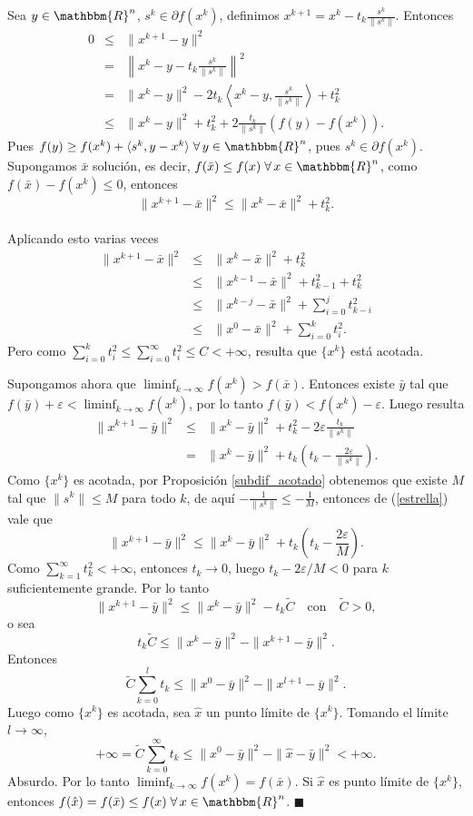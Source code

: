 \documentclass[a4paper,12pt]{report}
\newcommand{\la}{\langle}
\newcommand{\ra}{\rangle}
\newcommand{\RR}{\mathbbm{R}}
\newcommand{\Rn}{\RR^n}
\newcommand{\bx}{\bar{x}}
\newcommand{\vep}{\varepsilon}
\newcommand{\arr}{\rightarrow}
\newenvironment{dem}{\vspace*{-0.1cm}{\it Demostraci\'on:}}{\hfill
$\blacksquare$\\}
\begin{document}
\begin{dem}
Sea $y\in\Rn$, $s^k\in\partial f(x^k)$, definimos $x^{k+1}=x^k-t_k\frac{s^k}{\|s^k\|}$.
Entonces
\begin{eqnarray*}
0&\leq&\|x^{k+1}-y\|^2\\
&=&\left\|x^k-y-t_k\frac{s^k}{\|s^k\|}\right\|^2\\
&=&\|x^k-y\|^2-2t_k\left\la x^k-y,\frac{s^k}{\|s^k\|}\right\ra+t_k^2\\
&\leq&\|x^k-y\|^2+t_k^2+2\frac{t_k}{\|s^k\|}(f(y)-f(x^k)).
\end{eqnarray*}
Pues $f(y)\geq f(x^k)+\la s^k,y-x^k\ra\;\forall\,y\in\Rn$, pues $s^k\in\partial f(x^k)$.
Supongamos $\bx$ soluci\'on, es decir, $f(\bx)\leq f(x)\;\forall\,x\in\Rn$, como $f(\bx)-f(x^k)\leq 0$, entonces  $$\|x^{k+1}-\bx\|^2\leq\|x^k-\bx\|^2+t_k^2.$$\\
Aplicando esto varias veces
\begin{eqnarray*}
\|x^{k+1}-\bx\|^2&\leq&\|x^k-\bx\|^2+t_k^2\\
&\leq&\|x^{k-1}-\bx\|^2+t_{k-1}^2+t_k^2\\
&\leq&\|x^{k-j}-\bx\|^2+\sum_{i=0}^{j}t_{k-i}^2\\
&\leq&\|x^0-\bx\|^2+\sum_{i=0}^{k}t_i^2.
\end{eqnarray*}
Pero como $\sum_{i=0}^{k}t_i^2\leq\sum_{i=0}^{\infty}t_i^2\leq C<+\infty$, resulta que $\{x^k\}$ est\'a acotada.

Supongamos ahora que $\liminf_{k\arr\infty}f(x^k)>f(\bx)$. Entonces existe $\bar{y}$ tal que \linebreak $f(\bar{y})+\vep<\liminf_{k\arr\infty} f(x^k)$, por lo tanto $f(\bar{y})<f(x^k)-\vep$. Luego resulta
\begin{eqnarray}
\|x^{k+1}-\bar{y}\|^2&\leq&\|x^k-\bar{y}\|^2+t_k^2-2\vep\frac{t_k}{\|s^k\|}\\
&=&\|x^k-\bar{y}\|^2+t_k\left(t_k-\frac{2\vep}{\|s^k\|}\right).\label{estrella}
\end{eqnarray}
Como $\{x^k\}$ es acotada, por Proposici\'on \ref{subdif_acotado} obtenemos que existe $M$ tal que $\|s^k\|\leq M$ para todo $k$, de aqu\'i $-\frac{1}{\|s^k\|}\leq-\frac{1}{M}$, entonces de (\ref{estrella}) vale que
$$\|x^{k+1}-\bar{y}\|^2\leq \|x^k-\bar{y}\|^2+t_k\left(t_k-\frac{2\vep}{M}\right).$$
Como $\sum_{k=1}^{\infty}t_k^2<+\infty$, entonces $t_k\arr 0$, luego $t_k-2\vep/M<0$ para $k$ suficientemente grande.
Por lo tanto
$$\|x^{k+1}-\bar{y}\|^2\leq\|x^k-\bar{y}\|^2-t_k \tilde{C}\quad\mbox{con}\quad\tilde{C}>0,$$
o sea
$$t_k\tilde{C}\leq\|x^k-\bar{y}\|^2-\|x^{k+1}-\bar{y}\|^2.$$
Entonces
$$\tilde{C}\sum_{k=0}^{l}t_k\leq\|x^0-\bar{y}\|^2-\|x^{l+1}-\bar{y}\|^2.$$
Luego como $\{x^k\}$ es acotada, sea $\hat{x}$ un punto l\'imite de $\{x^k\}$. Tomando el l\'imite $l\arr\infty$,
$$+\infty=\tilde{C}\sum_{k=0}^{\infty}t_k\leq\|x^0-\bar{y}\|^2-\|\hat{x}-\bar{y}\|^2<+\infty.$$
Absurdo.
Por lo tanto $\liminf_{k\arr\infty}f(x^k)=f(\bx)$.
Si $\hat{x}$ es punto l\'imite de $\{x^k\}$, entonces $f(\hat{x})=f(\bx)\leq f(x)\;\forall\,x\in\Rn$.
\end{dem}
\end{document}
